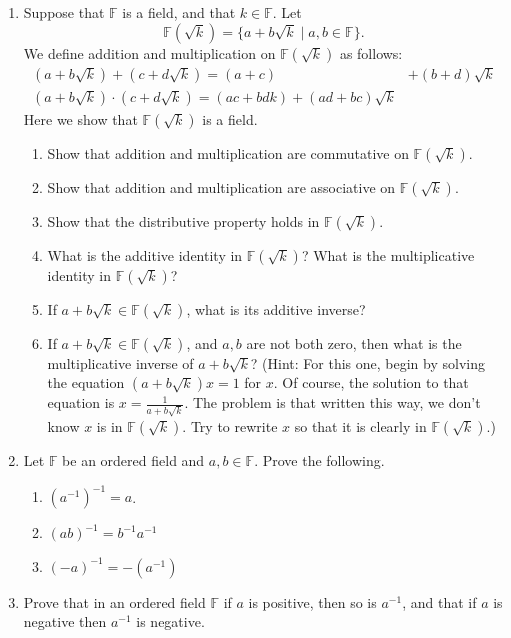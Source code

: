 \documentclass[11pt]{article}
\theoremstyle{definition}
\begin{document}
\begin{enumerate}
\item Suppose that $\mathbb{F}$ is a field, and that $k\in\mathbb{F}$. Let
  \[ \mathbb{F}(\sqrt{k}) = \{ a+b\sqrt{k} \mid a,b\in\mathbb{F} \}.\]
  We define addition and multiplication on $\mathbb{F}(\sqrt{k})$ as follows:
  \begin{align*}
    (a+b\sqrt{k}) + (c+d\sqrt{k}) = (a+c) &+ (b+d)\sqrt{k}\\
    (a+b\sqrt{k})\cdot (c+d\sqrt{k}) = (ac+bdk) + (ad+bc)\sqrt{k}
  \end{align*}
  Here we show that $\mathbb{F}(\sqrt{k})$ is a field.
  \begin{enumerate}
    \item Show that addition and multiplication are commutative on $\mathbb{F}(\sqrt{k})$.
    \item Show that addition and multiplication are associative on $\mathbb{F}(\sqrt{k})$.
    \item Show that the distributive property holds in $\mathbb{F}(\sqrt{k})$.
    \item What is the additive identity in $\mathbb{F}(\sqrt{k})$? What is the multiplicative identity in $\mathbb{F}(\sqrt{k})$?
    \item If $a+b\sqrt{k}\in\mathbb{F}(\sqrt{k})$, what is its additive inverse?
    \item If $a+b\sqrt{k}\in\mathbb{F}(\sqrt{k})$, and $a,b$ are not both zero, then what is the multiplicative inverse of $a+b\sqrt{k}$? 
      (Hint: For this one, begin by solving the equation $(a+b\sqrt{k})x=1$ for $x$. Of course, the solution to that equation is
      $x = \frac{1}{a+b\sqrt{k}}$. The problem is that written this way, we don't know $x$ is in $\mathbb{F}(\sqrt{k})$. Try to rewrite
      $x$ so that it is clearly in $\mathbb{F}(\sqrt{k})$.)
  \end{enumerate} \label{homework: quadratic extensions are fields}

  \item Let $\mathbb{F}$ be an ordered field and $a,b\in\mathbb{F}$. Prove the following.
    \begin{enumerate}
      \item $(a^{-1})^{-1} = a$.
      \item $(ab)^{-1} = b^{-1}a^{-1}$
      \item $(-a)^{-1} = -(a^{-1})$
    \end{enumerate}

  \item Prove that in an ordered field $\mathbb{F}$ if $a$ is positive, then so is $a^{-1}$, and that if $a$ is negative then $a^{-1}$ is negative. 


\end{enumerate}
\end{document}
